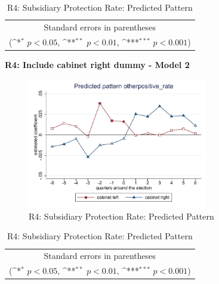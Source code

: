 \documentclass[10pt,a4paper]{scrartcl}
\begin{document}
\begin{table}[!ht]\centering
	\renewcommand{\arraystretch}{1.25}
	\def\sym#1{\ifmmode^{#1}\else\(^{#1}\)\fi}
	\caption{R4: Subsidiary Protection Rate: Predicted Pattern}
	\begin{tabular}{l*{2}{c}}
		\hline\hline
		
		\hline\hline
		\multicolumn{3}{c}{\footnotesize Standard errors in parentheses} \\
		\multicolumn{3}{c}{\footnotesize (\sym{*} \(p<0.05\), \sym{**} \(p<0.01\), \sym{***} \(p<0.001\))}\\
	\end{tabular}
\end{table}

\clearpage
\textbf{R4: Include cabinet right dummy - Model 2}
\begin{figure}[!ht]
	\centering
	\includegraphics[width=0.7\textwidth]{figures_edited/otherpositive_rate_graph2_R4.pdf}
	\caption{R4: Subsidiary Protection Rate: Predicted Pattern}
\end{figure}

\begin{table}[!ht]\centering
	\footnotesize
	\renewcommand{\arraystretch}{1.2}
	\def\sym#1{\ifmmode^{#1}\else\(^{#1}\)\fi}
	\caption{R4: Subsidiary Protection Rate: Predicted Pattern}
	\begin{tabular}{l*{2}{c}}
		\hline\hline
		
		\hline\hline
		\multicolumn{3}{c}{\footnotesize Standard errors in parentheses} \\
		\multicolumn{3}{c}{\footnotesize (\sym{*} \(p<0.05\), \sym{**} \(p<0.01\), \sym{***} \(p<0.001\))} \\
	\end{tabular}
\end{table}
\end{document}
